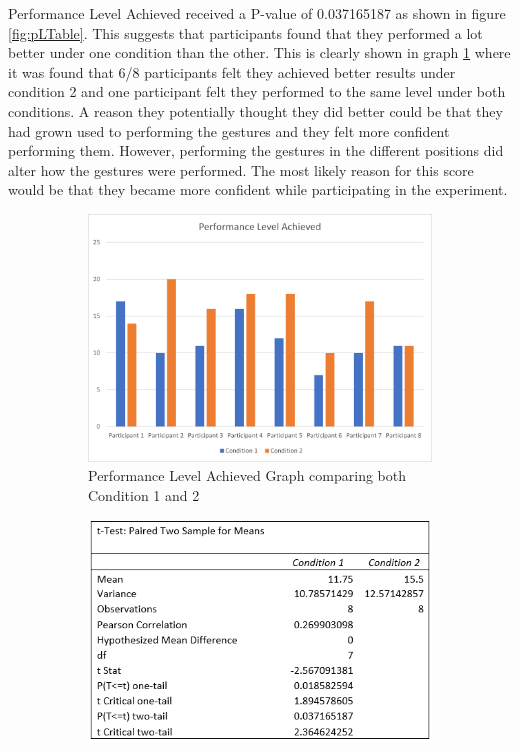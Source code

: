 \documentclass{l4proj}
\begin{document}
Performance Level Achieved received a P-value of 0.037165187 as shown in figure \ref{fig:pLTable}. This suggests that participants found that they performed a lot better under one condition than the other. This is clearly shown in graph \ref{fig:pLGraph} where it was found that 6/8 participants felt they achieved better results under condition 2 and one participant felt they performed to the same level under both conditions. A reason they potentially thought they did better could be that they had grown used to performing the gestures and they felt more confident performing them. However, performing the gestures in the different positions did alter how the gestures were performed. The most likely reason for this score would be that they became more confident while participating in the experiment.
 
 \begin{figure}[!htb]
    \centering
    \begin{subfigure}[b]{0.45\textwidth}
        \includegraphics[scale = 0.4]{images/PerformanceLevelAchievedGraph.png}
        \caption{Performance Level Achieved Graph comparing both Condition 1 and 2}
        \label{fig:pLGraph}
    \end{subfigure}
    \begin{subfigure}[b]{0.45\textwidth}
        \includegraphics[scale = 0.55]{images/PerformanceLevelAchievedTable.png}

\end{subfigure}
\end{figure}
\end{document}
